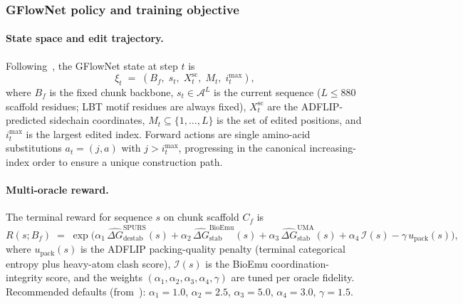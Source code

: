 \documentclass[11pt,oneside]{amsbook}
\numberwithin{equation}{section}
\theoremstyle{plain}
\theoremstyle{definition}
\theoremstyle{remark}
\begin{document}
\subsubsection{GFlowNet policy and training objective}

\paragraph{State space and edit trajectory.}
Following~\cite{SchreiberThermoGFN2025}, the GFlowNet state at step $t$ is
\[
  \xi_t \;=\; (B_f,\; s_t,\; X_t^{\mathrm{sc}},\; M_t,\; i_t^{\max}),
\]
where $B_f$ is the fixed chunk backbone, $s_t \in \mathcal{A}^L$ is the
current sequence ($L \le 880$ scaffold residues; LBT motif residues are
always fixed), $X_t^{\mathrm{sc}}$ are the ADFLIP-predicted sidechain
coordinates, $M_t \subseteq \{1,\ldots,L\}$ is the set of edited positions,
and $i_t^{\max}$ is the largest edited index.  Forward actions are single
amino-acid substitutions $a_t = (j,a)$ with $j > i_t^{\max}$, progressing
in the canonical increasing-index order to ensure a unique construction path.

\paragraph{Multi-oracle reward.}
The terminal reward for sequence $s$ on chunk scaffold $C_f$ is
\begin{equation}
  R(s; B_f) \;=\;
  \exp\!\bigl(
    \alpha_1\,\widehat{\Delta G}^{\mathrm{SPURS}}_{\mathrm{destab}}(s)
    + \alpha_2\,\widehat{\Delta G}^{\mathrm{BioEmu}}_{\mathrm{stab}}(s)
    + \alpha_3\,\widehat{\Delta G}^{\mathrm{UMA}}_{\mathrm{stab}}(s)
    + \alpha_4\,\mathcal{I}(s)
    - \gamma\,u_{\mathrm{pack}}(s)
  \bigr),
\label{eq:reward_QPU}
\end{equation}
where $u_{\mathrm{pack}}(s)$ is the ADFLIP packing-quality penalty (terminal
categorical entropy plus heavy-atom clash score), $\mathcal{I}(s)$ is the
BioEmu coordination-integrity score, and the weights
$(\alpha_1,\alpha_2,\alpha_3,\alpha_4,\gamma)$ are tuned per oracle fidelity.
Recommended defaults (from~\cite{SchreiberThermoGFN2025}):
$\alpha_1 = 1.0$, $\alpha_2 = 2.5$, $\alpha_3 = 5.0$, $\alpha_4 = 3.0$,
$\gamma = 1.5$.
\end{document}

